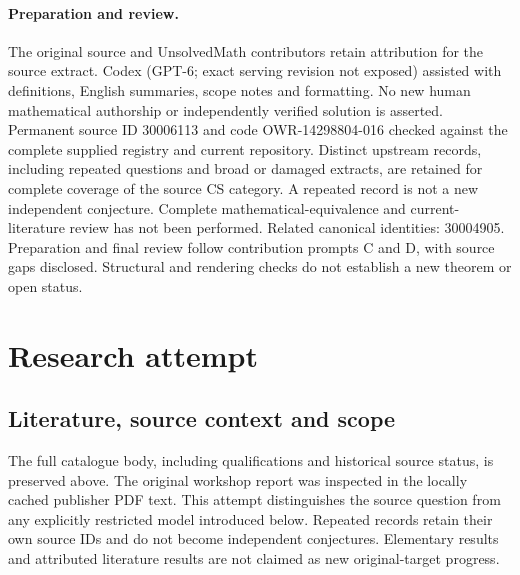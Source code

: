 \documentclass[11pt]{article}
\begin{document}
\paragraph{Preparation and review.}
The original source and UnsolvedMath contributors retain attribution for the source extract. Codex (GPT-6; exact serving revision not exposed) assisted with definitions, English summaries, scope notes and formatting. No new human mathematical authorship or independently verified solution is asserted. Permanent source ID 30006113 and code OWR-14298804-016 checked against the complete supplied registry and current repository. Distinct upstream records, including repeated questions and broad or damaged extracts, are retained for complete coverage of the source CS category. A repeated record is not a new independent conjecture. Complete mathematical-equivalence and current-literature review has not been performed. Related canonical identities: 30004905. Preparation and final review follow contribution prompts C and D, with source gaps disclosed. Structural and rendering checks do not establish a new theorem or open status.
\label{end:30006113}

\section{Research attempt}
\subsection{Literature, source context and scope}
The full catalogue body, including qualifications and historical source status, is preserved above. The original workshop report was inspected in the locally cached publisher PDF text. This attempt distinguishes the source question from any explicitly restricted model introduced below. Repeated records retain their own source IDs and do not become independent conjectures. Elementary results and attributed literature results are not claimed as new original-target progress.
\end{document}
